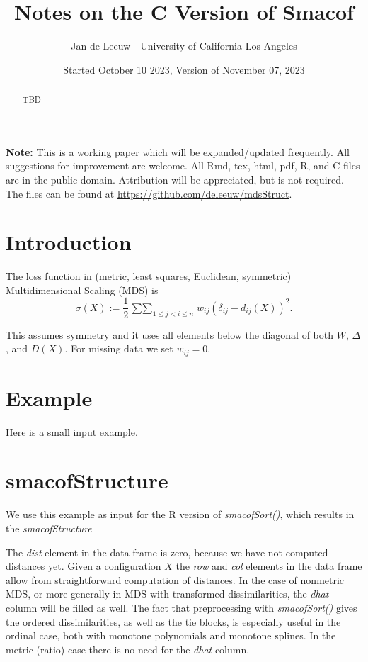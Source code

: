 \documentclass[
  12pt,
]{article}
\title{Notes on the C Version of Smacof}
\author{Jan de Leeuw - University of California Los Angeles}
\date{Started October 10 2023, Version of November 07, 2023}
\newcommand{\jis}{\mathop{\sum\sum}_{1\leq j<i\leq n}}
\begin{document}
\maketitle
\begin{abstract}
TBD
\end{abstract}

{
\setcounter{tocdepth}{4}
\tableofcontents
}
\textbf{Note:} This is a working paper which will be expanded/updated frequently. All suggestions for improvement are welcome. All Rmd, tex, html, pdf, R, and C files are in the public domain. Attribution
will be appreciated, but is not required. The files can be found at
\url{https://github.com/deleeuw/mdsStruct}.

\section{Introduction}\label{introduction}

The loss function in (metric, least squares, Euclidean, symmetric) Multidimensional Scaling (MDS)
is
\[
\sigma(X):=\frac12\jis w_{ij}(\delta_{ij}-d_{ij}(X))^2.
\]

This assumes symmetry and it uses all elements below the diagonal of both \(W\), \(\Delta\), and \(D(X)\).
For missing data we set \(w_{ij}=0\).

\section{Example}\label{example}

Here is a small input example.

\section{smacofStructure}\label{smacofstructure}

We use this example as input for the R version of \emph{smacofSort()}, which results in the
\emph{smacofStructure}

The \emph{dist} element in the data frame is zero, because we have not computed distances yet.
Given a configuration \(X\) the \emph{row} and \emph{col} elements in the data frame allow from
straightforward computation of distances. In the case of nonmetric MDS, or more generally
in MDS with transformed dissimilarities, the \emph{dhat} column will be filled as well.
The fact that preprocessing with \emph{smacofSort()} gives the ordered dissimilarities, as
well as the tie blocks, is especially useful in the ordinal case, both with monotone
polynomials and monotone splines. In the metric (ratio) case there is no need for the
\emph{dhat} column.
\end{document}
